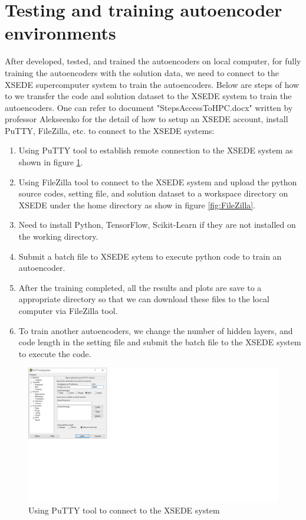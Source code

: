 \documentclass{article}
\begin{document}
\section{Testing and training autoencoder environments} 
After developed, tested, and trained the autoencoders on local computer, for fully training the autoencoders with the solution data, we need to connect to the XSEDE supercomputer system to train the autoencoders. Below are steps of how to we transfer the code and solution dataset to the XSEDE system to train the autoencoders. One can refer to document "StepsAccessToHPC.docx" written by professor Alekseenko for the detail of how to setup an XSEDE account, install PuTTY, FileZilla, etc. to connect to the XSEDE systems:
\begin{enumerate}
	\item Using PuTTY tool to establish remote connection to the XSEDE system as shown in figure \ref{fig:PuTTY}.
	\item Using FileZilla tool to connect to the XSEDE system and upload the python source codes, setting file, and solution dataset to a workspace directory on XSEDE under the home directory as show in figure \ref{fig:FileZilla}.
	\item Need to install Python, TensorFlow, Scikit-Learn if they are not installed on the working directory.
	\item Submit a batch file to XSEDE sytem to execute python code to train an autoencoder.
	\item After the training completed, all the results and plots are save to a appropriate directory so that we can download these files to the local computer via FileZilla tool.
	\item To train another autoencoders, we change the number of hidden layers, and code length in the setting file and submit the batch file to the XSEDE system to execute the code.
\end{enumerate}
\begin{figure}[h!]
	\centering
	\includegraphics[width=1\textwidth]{PuTTY.png}
	\caption{Using PuTTY tool to connect to the XSEDE system }
	\label{fig:PuTTY}
\end{figure}
\end{document}
